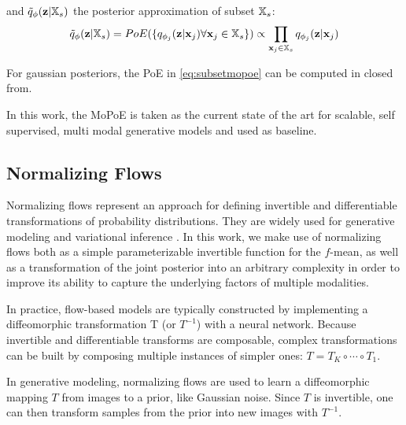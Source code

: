 and $\tilde{q}_{\phi}(\textbf{z}|\mathbb{X}_s)$ the posterior approximation of subset $\mathbb{X}_s$:
\begin{equation}
    \label{eq:subsetmopoe}
    \tilde{q}_{\phi}(\textbf{z}|\mathbb{X}_s)=PoE(\{q_{\phi_j}(\textbf{z}|\textbf{x}_j) \forall \textbf{x}_j \in \mathbb{X}_s\}) \propto \prod _{\textbf{x}_j \in \mathbb{X}_s}q_{\phi_j}(\textbf{z}|\textbf{x}_j)
\end{equation}

For gaussian posteriors, the PoE in \cref{eq:subsetmopoe} can be computed in closed from.

In this work, the MoPoE is taken as the current state of the art for scalable, self supervised, multi modal generative models and used as baseline.

\subsection{Normalizing Flows}
Normalizing flows \parencite{papamakarios_normalizing_2019} represent an approach for defining invertible and differentiable transformations of probability distributions.
They are widely used for generative modeling \citep[\textbf{GLOW}, \textbf{Real NVP}]{kingma_glow_2018, dinh_density_2017} and variational inference \parencite{rezende_variational_2016, berg_sylvester_2019}.
In this work, we make use of normalizing flows both as a simple parameterizable invertible function for the $f$-mean, as well as a transformation of the joint posterior into an arbitrary complexity in order to improve its ability to capture the underlying factors of multiple modalities.

In practice, flow-based models are typically constructed by implementing a diffeomorphic transformation T (or $T^{-1}$) with a neural network.
Because invertible and differentiable transforms are composable, complex transformations can be built by composing multiple instances of simpler ones: $T=T_K \circ \cdots \circ T_1$.

In generative modeling, normalizing flows are used to learn a diffeomorphic mapping $T$ from images to a prior, like Gaussian noise.
Since $T$ is invertible, one can then transform samples from the prior into new images with $T^{-1}$.



